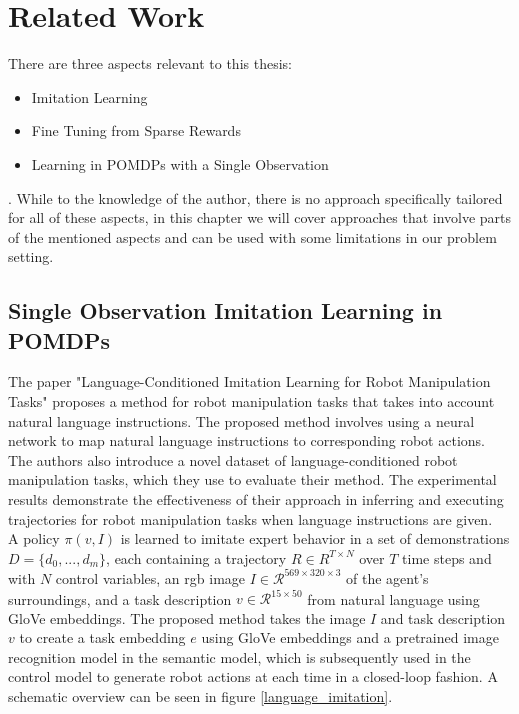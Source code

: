 
\chapter{Related Work}
\label{chapter:RelWork}
There are three aspects relevant to this thesis:
\begin{itemize}
    \item Imitation Learning
    \item Fine Tuning from Sparse Rewards
    \item Learning in POMDPs with a Single Observation
\end{itemize}
. While to the knowledge of the author, there is no approach specifically tailored for all of these aspects, in this chapter we will cover approaches that involve parts 
of the mentioned aspects and can be used with some limitations in our problem setting.

\section{Single Observation Imitation Learning in POMDPs}
The paper "Language-Conditioned Imitation Learning for Robot Manipulation Tasks" \cite{Language-Conditioned Imitation} proposes a method for robot manipulation tasks that takes 
into account natural language instructions. The proposed method involves using a neural network to map natural language instructions to 
corresponding robot actions. The authors also introduce a novel dataset of language-conditioned robot manipulation tasks, which they use to evaluate 
their method. The experimental results demonstrate the effectiveness of their approach in inferring and executing trajectories for robot manipulation 
tasks when language instructions are given.\\

A policy $\pi(v,I)$ is learned to imitate expert behavior in a set of demonstrations $D = \{d_0,...,d_m\}$, each containing a trajectory 
$R \in R^{T \times N}$ over $T$ time steps and with $N$ control variables, an rgb image $I \in \mathcal{R}^{569 \times 320 \times 3}$ of the agent's surroundings, 
and a task description $v \in \mathcal{R}^{15 \times 50}$ from natural language using GloVe \cite{GloVe} embeddings. The proposed method takes the image $I$ and task description $v$ 
to create a task embedding $e$ using GloVe embeddings and a pretrained image recognition model in the semantic model, 
which is subsequently used in the control model to generate robot actions at each time in a closed-loop 
fashion. A schematic overview can be seen in figure \ref{language_imitation}.

